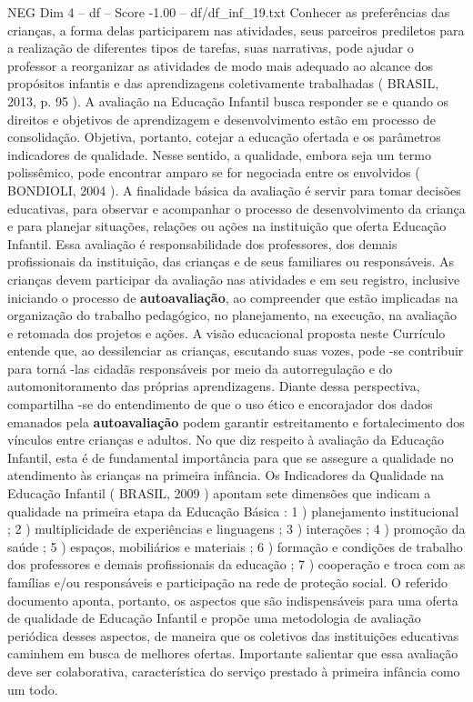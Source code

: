 \begin{textsample}{NEG Dim 4 – df – Score -1.00 – df/df\_inf\_19.txt}
Conhecer as preferências das crianças, a forma delas participarem nas atividades, seus parceiros prediletos para a realização de diferentes tipos de tarefas, suas narrativas, pode ajudar o professor a reorganizar as atividades de modo mais adequado ao alcance dos propósitos infantis e das aprendizagens coletivamente trabalhadas ( BRASIL, 2013, p. 95 ).
A avaliação na Educação Infantil busca responder se e quando os direitos e objetivos de aprendizagem e desenvolvimento estão em processo de consolidação.
Objetiva, portanto, cotejar a educação ofertada e os parâmetros indicadores de qualidade.
Nesse sentido, a qualidade, embora seja um termo polissêmico, pode encontrar amparo se for negociada entre os envolvidos ( BONDIOLI, 2004 ).
A finalidade básica da avaliação é servir para tomar decisões educativas, para observar e acompanhar o processo de desenvolvimento da criança e para planejar situações, relações ou ações na instituição que oferta Educação Infantil.
Essa avaliação é responsabilidade dos professores, dos demais profissionais da instituição, das crianças e de seus familiares ou responsáveis.
As crianças devem participar da avaliação nas atividades e em seu registro, inclusive iniciando o processo de \textbf{autoavaliação}, ao compreender que estão implicadas na organização do trabalho pedagógico, no planejamento, na execução, na avaliação e retomada dos projetos e ações.
A visão educacional proposta neste Currículo entende que, ao dessilenciar as crianças, escutando suas vozes, pode -se contribuir para torná -las cidadãs responsáveis por meio da autorregulação e do automonitoramento das próprias aprendizagens.
Diante dessa perspectiva, compartilha -se do entendimento de que o uso ético e encorajador dos dados emanados pela \textbf{autoavaliação} podem garantir estreitamento e fortalecimento dos vínculos entre crianças e adultos.
No que diz respeito à avaliação da Educação Infantil, esta é de fundamental importância para que se assegure a qualidade no atendimento às crianças na primeira infância.
Os Indicadores da Qualidade na Educação Infantil ( BRASIL, 2009 ) apontam sete dimensões que indicam a qualidade na primeira etapa da Educação Básica : 1 ) planejamento institucional ; 2 ) multiplicidade de experiências e linguagens ; 3 ) interações ; 4 ) promoção da saúde ; 5 ) espaços, mobiliários e materiais ; 6 ) formação e condições de trabalho dos professores e demais profissionais da educação ; 7 ) cooperação e troca com as famílias e/ou responsáveis e participação na rede de proteção social.
O referido documento aponta, portanto, os aspectos que são indispensáveis para uma oferta de qualidade de Educação Infantil e propõe uma metodologia de avaliação periódica desses aspectos, de maneira que os coletivos das instituições educativas caminhem em busca de melhores ofertas.
Importante salientar que essa avaliação deve ser colaborativa, característica do serviço prestado à primeira infância como um todo.

\end{textsample}
